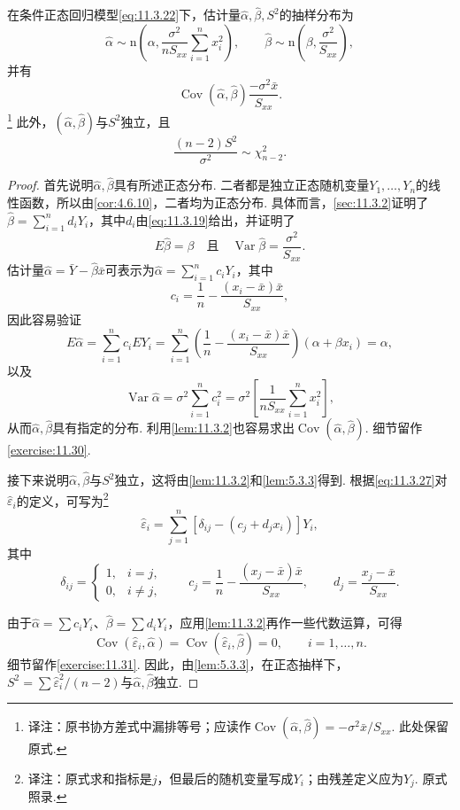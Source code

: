 \begin{theorem}\label{thm:11.3.3}
在条件正态回归模型\eqref{eq:11.3.22}下，估计量$\hat\alpha,\hat\beta,S^2$的抽样分布为
$$\hat\alpha\sim\mathrm n\left(\alpha,\frac{\sigma^2}{nS_{xx}}\sum_{i=1}^nx_i^2\right),
\qquad\hat\beta\sim\mathrm n\left(\beta,\frac{\sigma^2}{S_{xx}}\right),$$
并有
$$\operatorname{Cov}(\hat\alpha,\hat\beta)\frac{-\sigma^2\bar x}{S_{xx}}.$$
\footnote{译注：原书协方差式中漏排等号；应读作$\operatorname{Cov}(\hat\alpha,\hat\beta)=-\sigma^2\bar x/S_{xx}$. 此处保留原式.}
此外，$(\hat\alpha,\hat\beta)$与$S^2$独立，且
$$\frac{(n-2)S^2}{\sigma^2}\sim\chi^2_{n-2}.$$
\end{theorem}
\begin{proof}
首先说明$\hat\alpha,\hat\beta$具有所述正态分布. 二者都是独立正态随机变量$Y_1,\ldots,Y_n$的线性函数，所以由\autoref{cor:4.6.10}，二者均为正态分布. 具体而言，\autoref{sec:11.3.2}证明了$\hat\beta=\sum_{i=1}^nd_iY_i$，其中$d_i$由\eqref{eq:11.3.19}给出，并证明了
$$E\hat\beta=\beta\quad\text{且}\quad\operatorname{Var}\hat\beta=\frac{\sigma^2}{S_{xx}}.$$
估计量$\hat\alpha=\bar Y-\hat\beta\bar x$可表示为$\hat\alpha=\sum_{i=1}^nc_iY_i$，其中
$$c_i=\frac1n-\frac{(x_i-\bar x)\bar x}{S_{xx}},$$
因此容易验证
$$E\hat\alpha=\sum_{i=1}^nc_iEY_i
=\sum_{i=1}^n\left(\frac1n-\frac{(x_i-\bar x)\bar x}{S_{xx}}\right)(\alpha+\beta x_i)=\alpha,$$
以及
$$\operatorname{Var}\hat\alpha=\sigma^2\sum_{i=1}^nc_i^2
=\sigma^2\left[\frac1{nS_{xx}}\sum_{i=1}^nx_i^2\right],$$
从而$\hat\alpha,\hat\beta$具有指定的分布. 利用\autoref{lem:11.3.2}也容易求出$\operatorname{Cov}(\hat\alpha,\hat\beta)$. 细节留作\autoref{exercise:11.30}.

接下来说明$\hat\alpha,\hat\beta$与$S^2$独立，这将由\autoref{lem:11.3.2}和\autoref{lem:5.3.3}得到. 根据\eqref{eq:11.3.27}对$\hat\varepsilon_i$的定义，可写为\footnote{译注：原式求和指标是$j$，但最后的随机变量写成$Y_i$；由残差定义应为$Y_j$. 原式照录.}
\begin{equation}\label{eq:11.3.30}
\hat\varepsilon_i=\sum_{j=1}^n[\delta_{ij}-(c_j+d_jx_i)]Y_i,
\end{equation}
其中
$$\delta_{ij}=\begin{cases}1,&i=j,\\0,&i\ne j,\end{cases}
\qquad c_j=\frac1n-\frac{(x_j-\bar x)\bar x}{S_{xx}},\qquad d_j=\frac{x_j-\bar x}{S_{xx}}.$$

由于$\hat\alpha=\sum c_iY_i$、$\hat\beta=\sum d_iY_i$，应用\autoref{lem:11.3.2}再作一些代数运算，可得
$$\operatorname{Cov}(\hat\varepsilon_i,\hat\alpha)=\operatorname{Cov}(\hat\varepsilon_i,\hat\beta)=0,\qquad i=1,\ldots,n.$$
细节留作\autoref{exercise:11.31}. 因此，由\autoref{lem:5.3.3}，在正态抽样下，$S^2=\sum\hat\varepsilon_i^2/(n-2)$与$\hat\alpha,\hat\beta$独立.


\end{proof}
